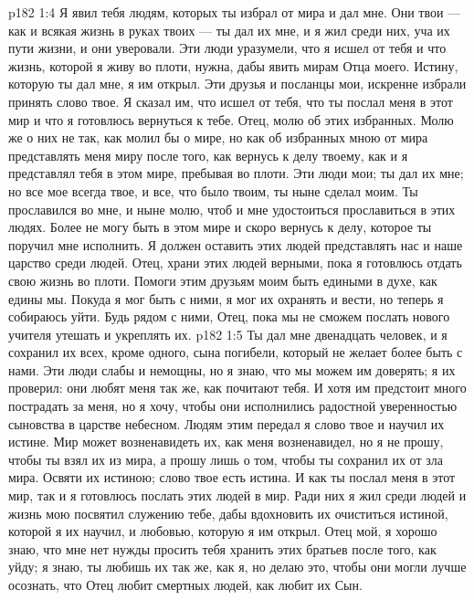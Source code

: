 \vs p182 1:4 Я явил тебя людям, которых ты избрал от мира и дал мне. Они твои --- как и всякая жизнь в руках твоих --- ты дал их мне, и я жил среди них, уча их пути жизни, и они уверовали. Эти люди уразумели, что я исшел от тебя и что жизнь, которой я живу во плоти, нужна, дабы явить мирам Отца моего. Истину, которую ты дал мне, я им открыл. Эти друзья и посланцы мои, искренне избрали принять слово твое. Я сказал им, что исшел от тебя, что ты послал меня в этот мир и что я готовлюсь вернуться к тебе. Отец, молю об этих избранных. Молю же о них не так, как молил бы о мире, но как об избранных мною от мира представлять меня миру после того, как вернусь к делу твоему, как и я представлял тебя в этом мире, пребывая во плоти. Эти люди мои; ты дал их мне; но все мое всегда твое, и все, что было твоим, ты ныне сделал моим. Ты прославился во мне, и ныне молю, чтоб и мне удостоиться прославиться в этих людях. Более не могу быть в этом мире и скоро вернусь к делу, которое ты поручил мне исполнить. Я должен оставить этих людей представлять нас и наше царство среди людей. Отец, храни этих людей верными, пока я готовлюсь отдать свою жизнь во плоти. Помоги этим друзьям моим быть едиными в духе, как едины мы. Покуда я мог быть с ними, я мог их охранять и вести, но теперь я собираюсь уйти. Будь рядом с ними, Отец, пока мы не сможем послать нового учителя утешать и укреплять их.
\vs p182 1:5 Ты дал мне двенадцать человек, и я сохранил их всех, кроме одного, сына погибели, который не желает более быть с нами. Эти люди слабы и немощны, но я знаю, что мы можем им доверять; я их проверил: они любят меня так же, как почитают тебя. И хотя им предстоит много пострадать за меня, но я хочу, чтобы они исполнились радостной уверенностью сыновства в царстве небесном. Людям этим передал я слово твое и научил их истине. Мир может возненавидеть их, как меня возненавидел, но я не прошу, чтобы ты взял их из мира, а прошу лишь о том, чтобы ты сохранил их от зла мира. Освяти их истиною; слово твое есть истина. И как ты послал меня в этот мир, так и я готовлюсь послать этих людей в мир. Ради них я жил среди людей и жизнь мою посвятил служению тебе, дабы вдохновить их очиститься истиной, которой я их научил, и любовью, которую я им открыл. Отец мой, я хорошо знаю, что мне нет нужды просить тебя хранить этих братьев после того, как уйду; я знаю, ты любишь их так же, как я, но делаю это, чтобы они могли лучше осознать, что Отец любит смертных людей, как любит их Сын.
